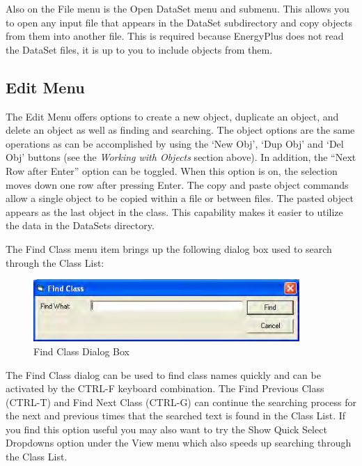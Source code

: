 Also on the File menu is the Open DataSet menu and submenu. This allows you to open any input file that appears in the DataSet subdirectory and copy objects from them into another file. This is required because EnergyPlus does not read the DataSet files, it is up to you to include objects from them.

\subsection{Edit Menu}\label{edit-menu-000}

The Edit Menu offers options to create a new object, duplicate an object, and delete an object as well as finding and searching. The object options are the same operations as can be accomplished by using the `New Obj', `Dup Obj' and `Del Obj' buttons (see the \emph{Working with Objects} section above). In addition, the ``Next Row after Enter'' option can be toggled. When this option is on, the selection moves down one row after pressing Enter. The copy and paste object commands allow a single object to be copied within a file or between files. The pasted object appears as the last object in the class. This capability makes it easier to utilize the data in the DataSets directory.

The Find Class menu item brings up the following dialog box used to search through the Class List:

\begin{figure}[hbtp] %
\centering
\includegraphics[width=0.9\textwidth, height=0.9\textheight, keepaspectratio=true]{media/image118.png}
\caption{Find Class Dialog Box \protect \label{fig:find-class-dialog-box}}
\end{figure}

The Find Class dialog can be used to find class names quickly and can be activated by the CTRL-F keyboard combination. The Find Previous Class (CTRL-T) and Find Next Class (CTRL-G) can continue the searching process for the next and previous times that the searched text is found in the Class List. If you find this option useful you may also want to try the Show Quick Select Dropdowns option under the View menu which also speeds up searching through the Class List.

